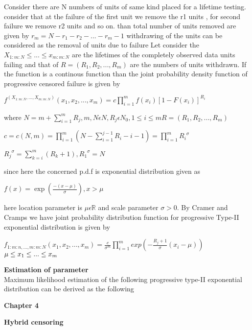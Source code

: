 \documentclass[12pt]{article}
\begin{document}
 
 Consider there are N numbers of units of same kind placed for a lifetime testing. consider that at the failure of the first unit we remove the r1 units , for second failure we remove r2 units and so on.
 than total number of units removed are given by $r_{m}=N-r_{1}-r_{2}-...-r_{m}-1$
 withdrawing of the units can be considered as the removal of units due to failure 
 Let consider the $X_{1:m:N}\leq ... \leq x_{m:m:N} $ are the lifetimes of the completely observed data units failing and that of $R=(R_{1},R_{2},...,R_{m})$ are the numbers of units withdrawn. If the function is a continous function than the joint probability density function of progressive censored failure is given by
 \begin{center}
 	$f^(X_{1:m:N},...,X_{m:m:N}) (x_{1},x_{2},...,x_{m})=c\prod_{i=1}^{m}f(x_{i})[1-F(x_{i})]^{R_{i}}$
 \begin{flushleft}
 where $N=m+\sum_{i=1}^{m} R_{j},m,N \epsilon N ,R_{j}\epsilon N_{0},1\leq i \leq m R=(R_{1},R_{2},...,R_{m})$
 \end{flushleft}
 $c=c(N,m)=\prod_{i=1}^{m}(N-\sum_{i=1}^{j-1} R_{i}-i-1)=\prod_{i=1}^{m} {R_{i}}^\sigma $
 \begin{flushleft}
 	${R_{j}}^\sigma=\sum_{k=i}^{m}(R_{k}+1), {R_{1}}^\sigma=N$ 
 \end{flushleft}
 \end{center}
 since here the concerned p.d.f is exponential distribution given as
 \begin{center}
 	$f(x)=\exp(\frac{-(x-\mu)}{\sigma}), x>\mu$\\
 \end{center}
 here location parameter is $\mu\epsilon\mathbb{R} $ and scale parameter $\sigma>0$. By Cramer and Cramps we have joint probability distribution function for progressive Type-II exponential distribution is given by\\
 \begin{center}
 $f_{1:m:n,...,m:m:N}(x_{1},x_{2},...,x_{m})=\frac{c}{\sigma^m}\prod_{i=1}^{m} exp(-\frac{R_{j}+1}{\sigma} (x_{i}-\mu))$\\
 $\hfill \mu \leq x_{1}\leq ... \leq x_{m}$
\end{center}
\textbf{ Estimation of parameter}\\
Maximum likelihood estimation of the following progressive type-II exponential distribution can be derived as the following \\


\newpage
\begin{flushleft}
	\textbf{\Large Chapter 4}
\end{flushleft}
\vspace{0.1cm}
\begin{flushleft}
	\textbf{\Large Hybrid censoring}
\end{flushleft}
\end{document}
